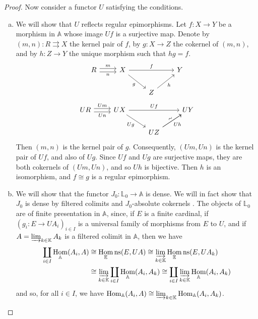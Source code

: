 \documentclass{article}
\newcommand{\bb}[1]{{\mathbb{#1}}}
\newcommand{\Set}{\mathbb{E}\mathrm{ns}}
\DeclareMathOperator{\Hom}{Hom}
\newcommand{\oldpage}[1]{\marginpar{\footnotesize$\Big\vert$ \textit{p.~#1}}}
\begin{document}
\begin{proof}
  Now consider a functor $U$ satisfying the conditions.
  \begin{enumerate}[a)]
    \item We will show that $U$ reflects regular epimorphisms.
      Let $f\colon X\to Y$ be a morphism in $\bb{A}$ whose image $Uf$ is a surjective map.
      Denote by $(m,n)\colon R\rightrightarrows X$ the kernel pair of $f$, by $g\colon X\to Z$ the cokernel of $(m,n)$, and by $h\colon Z\to Y$ the unique morphism such that $hg=f$.
      \[
        \begin{tikzcd}
          R \rar[shift left,"m"] \rar[shift right,swap,"n"]
          & X \ar[rr,"f"] \ar[dr,swap,"g"]
          && Y
        \\&& Z \ar[ur,swap,"h"]
        \end{tikzcd}
      \]
      \[
        \begin{tikzcd}
          UR \rar[shift left,"Um"] \rar[shift right,swap,"Un"]
          & UX \ar[rr,"Uf"] \ar[dr,swap,"Ug"]
          && UY
        \\&& UZ \ar[ur,swap,"Uh"] \ar[ur,sloped,"\sim"]
        \end{tikzcd}
      \]
      Then $(m,n)$ is the kernel pair of $g$.
      Consequently, $(Um,Un)$ is the kernel pair of $Uf$, and also of $Ug$.
      Since $Uf$ and $Ug$ are surjective maps, they are both cokernels of $(Um,Un)$, and so $Uh$ is bijective.
      Then $h$ is an isomorphism, and $f\cong g$ is a regular epimorphism.
\oldpage{202}
    \item We will show that the functor $J_0\colon\bb{L}_0\to\bb{A}$ is dense.
      We will in fact show that $J_0$ is dense by filtered colimits and $J_0$-absolute cokernels \cite{4}.
      The objects of $\bb{L}_0$ are of finite presentation in $\bb{A}$, since, if $E$ is a finite cardinal, if $(g_i\colon E\to UA_i)_{i\in I}$ is a universal family of morphisms from $E$ to $U$, and if $A=\varinjlim_{k\in\bb{K}}A_k$ is a filtered colimit in $\bb{A}$, then we have
      \[
        \begin{aligned}
          \coprod_{i\in I} \Hom_\bb{A}(A_i,A)
          &\cong \Hom_\Set(E,UA)
          \cong \varinjlim_{k\in\bb{K}} \Hom_\Set(E,UA_k)
        \\&\cong \varinjlim_{k\in\bb{K}} \coprod_{i\in I} \Hom_\bb{A}(A_i,A_k)
          \cong \coprod_{i\in I} \varinjlim_{k\in\bb{K}} \Hom_\bb{A}(A_i,A_k)
        \end{aligned}
      \]
      and so, for all $i\in I$, we have $\Hom_\bb{A}(A_i,A)\cong\varinjlim_{k\in\bb{K}}\Hom_\bb{A}(A_i,A_k)$.

\end{enumerate}
\end{proof}
\end{document}
